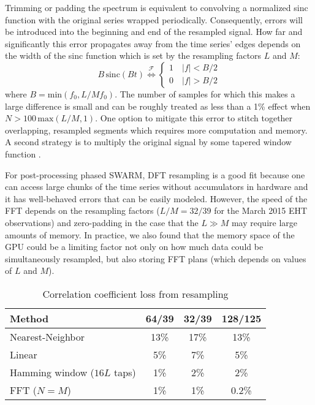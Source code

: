 Trimming or padding the spectrum is equivalent to convolving a normalized sinc function with the original series 
wrapped periodically.  Consequently, errors will be introduced into the beginning and end of the
resampled signal.  How far and significantly this error propagates away from the time series' edges depends 
on the width of the sinc function which is set by the resampling factors $L$ and $M$: 
\begin{equation} \label{eq:sinc}
B\,\mathrm{sinc}(B t) \overset{\mathcal{F}}{\Longleftrightarrow} \begin{cases} 1 \quad |f| < B/2 \\ 0 \quad |f| > B/2 \end{cases}
\end{equation}
where $B = \mathrm{min}(f_0,L/Mf_0)$.  
The number of samples for which this makes a large difference is small and can be roughly treated as less than a 
1\% effect when $N > 100\,\mathrm{max}(L/M,1)$.  One option to mitigate this error to stitch together 
overlapping, resampled segments \citep{bi11} which requires more computation and memory.  A second strategy is to 
multiply the original signal by some tapered window function \citep{fraser89}.

For post-processing phased SWARM, DFT resampling is a good fit because one can access large chunks of 
the time series without accumulators in hardware and it has well-behaved errors
that can be easily modeled.  However, the speed of the FFT depends on the resampling factors ($L/M = 32/39$ for 
the March 2015 EHT observations) and zero-padding in the case that the $L\gg M$ may require large amounts of 
memory.  In practice, we also found that the memory space of the GPU could be a limiting factor not only 
on how much data could be simultaneously resampled, but also storing FFT plans (which depends on
values of $L$ and $M$).

\begin{table}
\begin{center}
\centering
\caption{Correlation coefficient loss from resampling \label{tab:loss}}
\begin{threeparttable}
\begin{tabular}{l|ccc}
\toprule
Method & 64/39 & 32/39 & 128/125 \\
\midrule
Nearest-Neighbor            & 13\% & 17\% & 13\% \\
Linear                      &  5\% &  7\% &  5\% \\
Hamming window ($16L$ taps) &  1\% &  2\% &  2\% \\
FFT ($N=M$)                 &  1\% &  1\% & 0.2\% \\
\bottomrule
\end{tabular}
\end{threeparttable}
\end{center}
\end{table}

